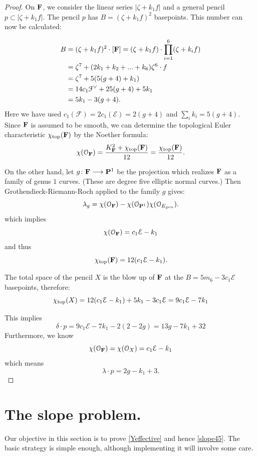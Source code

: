 \documentclass[reqno, 10 pt]{article}
\theoremstyle{definition}
\theoremstyle{remark}
\numberwithin{equation}{section}
\numberwithin{thm}{section}
\numberwithin{prop}{section}
\numberwithin{lem}{section}
\numberwithin{cor}{section}
\numberwithin{conj}{section}
\numberwithin{defn}{section}
\newcommand{\F}{{\mathbf F}}
\renewcommand{\to}{\longrightarrow}
\newcommand{\cE}{{\mathcal E}}
\newcommand{\cF}{{\mathcal F}}
\renewcommand{\P}{{\bf P}}
\renewcommand{\F}{{\bf F}}
\newcommand {\from}{{\colon}}
\renewcommand {\top}{{\rm top}}
\begin{document}
\begin{proof}
On $\F$, we consider the linear series $|\zeta + k_1 f|$ and a general pencil $p \subset |\zeta + k_1 f|$. The pencil $p$ has $B = (\zeta + k_1 f)^2$ basepoints.  This number can now be calculated:

\begin{align*}
B &= (\zeta + k_{1} f)^2\cdot [\F] = (\zeta + k_{1} f) \cdot \prod_{i=1}^{6}(\zeta + k_{i} f)\\
&= \zeta^7+ (2 k_1+k_2+ ... +k_6)\zeta^6\cdot f\\
& = \zeta^7+5(5(g+4) + k_{1})\\
&= 14c_{1}\dual{\cF} + 25(g+4) + 5k_{1}\\
& = 5k_{1}-3(g+4).
\end{align*}
Here we have used $c_{1}(\cF) = 2c_{1}(\cE) = 2(g+4)$ and $\sum_{i}k_{i} = 5(g+4)$.
Since $\F$ is assumed to be smooth, we can determine the topological Euler characteristic $\chi_{\top}(\F)$ by the Noether formula:
\begin{equation}\label{noether}
\chi(\mathcal{O}_\F) = \frac{K_{\F}^2 + \chi_{\top}(\F)}{12} = \frac{\chi_{\top}(\F)}{12}.
\end{equation}

On the other hand, let $g \from \F \to \P^{1}$ be the projection which realizes $\F$ as a family of genus $1$ curves. (These are degree five elliptic normal curves.) Then Grothendieck-Riemann-Roch applied to the family $g$ gives:
\begin{equation}
 \lambda_{g} =  \chi(\mathcal{O}_\F) - \chi(\mathcal{O}_{{\bf P}^1})\chi(\mathcal{O}_{E_{gen}}). 
\end{equation}
which implies
$$\chi(\mathcal{O}_\F) = c_{1}\mathcal{E} - k_{1}$$
and thus
$$ \chi_{\top}(\F) = 12(c_{1}\mathcal{E} - k_{1}).$$


 The total space of the pencil $X$ is the blow up of $\F$ at the $B = 5m_6-3c_1\mathcal{E}$ basepoints, therefore: $$\chi_{\top}(X) = 12(c_{1}\mathcal{E} - k_{1}) + 5k_{1} -3c_1\mathcal{E} = 9c_{1}\mathcal{E} - 7k_{1}$$

This implies  $$\delta \cdot p = 9c_{1}\mathcal{E} - 7k_{1} - 2(2-2g) = 13g - 7k_{1} + 32$$ Furthermore, we know  $$\chi(\mathcal{O}_{\F}) = \chi(\mathcal{O}_{X}) =  c_{1}\mathcal{E} - k_{1}$$ which means $$\lambda \cdot p = 2g - k_{1} +3.$$

\end{proof}






\section{The slope problem.}\label{slopeproblem}
Our objective in this section is to prove \autoref{Yeffective} and hence \autoref{slope45}. The basic strategy is simple enough, although implementing it will involve some care.  
\end{document}
